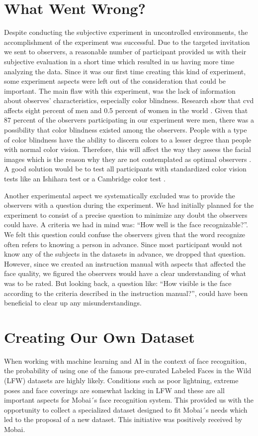 \section{What Went Wrong?}
Despite conducting the subjective experiment in uncontrolled environments, the accomplishment of the experiment was successful. Due to the targeted invitation we sent to observers, a reasonable number of participant provided us with their subjective evaluation in a short time which resulted in us having more time analyzing the data. Since it was our first time creating this kind of experiment, some experiment aspects were left out of the consideration that could be important. The main flaw with this experiment, was the lack of information about observes' characteristics, especially color blindness. Research show that \acrfull{cvd} affects eight percent of men and 0.5 percent of women in the world \cite{colorblindness}. Given that 87 percent of the observers participating in our experiment were men, there was a possibility that color blindness existed among the observers. People with a type of color blindness have the ability to discern colors to a lesser degree than people with normal color vision. Therefore, this will affect the way they assess the facial images which is the reason why they are not contemplated as optimal observers \cite{Xphdthesis}. A good solution would be to test all participants with standardized color vision tests like an Ishihara test \cite{Ishihara} or a Cambridge color test \cite{CambridgeColorTest}.   

Another experimental aspect we systematically excluded was to provide the observers with a question during the experiment. We had initially planned for the experiment to consist of a precise question to minimize any doubt the observers could have. A criteria we had in mind was: ``How well is the face recognizable?''. We felt this question could confuse the observers given that the word recognize often refers to knowing a person in advance. Since most participant would not know any of the subjects in the datasets in advance, we dropped that question. However, since we created an instruction manual with aspects that affected the face quality, we figured the observers would have a clear understanding of what was to be rated. But looking back, a question like: ``How visible is the face according to the criteria described in the instruction manual?'', could have been beneficial to clear up any misunderstandings.   

\section{Creating Our Own Dataset}
\label{sec:ownData}
When working with machine learning and AI in the context of face recognition, the probability of using one of the famous pre-curated Labeled Faces in the Wild (LFW) datasets are highly likely. Conditions such as poor lightning, extreme poses and face coverings are somewhat lacking in LFW and these are all important aspects for Mobai´s face recognition system. This provided us with the opportunity to collect a specialized dataset designed to fit Mobai´s needs which led to the proposal of a new dataset. This initiative was positively received by Mobai.

